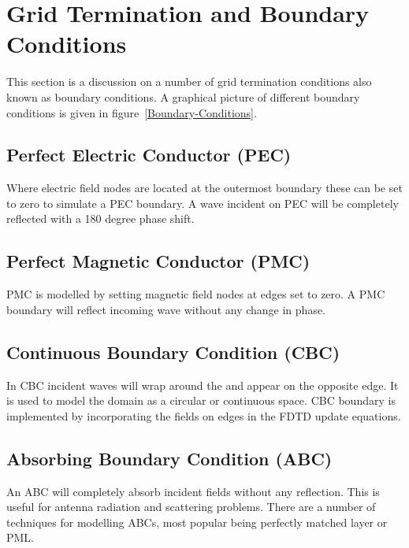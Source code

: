 \documentclass[10pt,A4paper]{report}
\begin{document}
\section{Grid Termination and Boundary Conditions}
This section is a discussion on a number of grid termination conditions also known as boundary conditions. A graphical picture of different boundary conditions is given in figure~\ref{Boundary-Conditions}.
\subsection{Perfect Electric Conductor (PEC)}
Where electric field nodes are located at the outermost boundary these can be set to zero to simulate a PEC boundary. A wave incident on PEC will be completely reflected with a 180 degree phase shift.
\subsection{Perfect Magnetic Conductor (PMC)}
PMC is modelled by setting magnetic field nodes at edges set to zero. A PMC boundary will reflect incoming wave without any change in phase.
\subsection{Continuous Boundary Condition (CBC)}
In CBC incident waves will wrap around the and appear on the opposite edge. It is used to model the domain as a circular or continuous space. CBC boundary is implemented by incorporating the fields on edges in the FDTD update equations.
\subsection{Absorbing Boundary Condition (ABC)}
An ABC will completely absorb incident fields without any reflection. This is useful for antenna radiation and scattering problems. There are a number of techniques for modelling ABCs, most popular being perfectly matched layer or PML.
\end{document}
